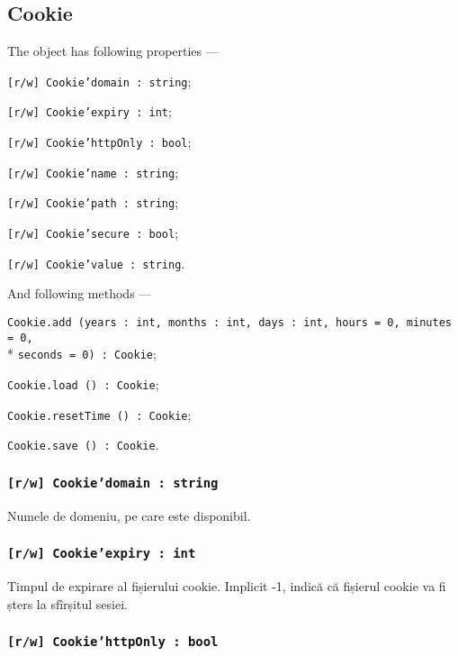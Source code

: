 \subsection{{\color{orange} Cookie}}

The object \cookie{} has following properties —
\begin{icItems}
	\item \texttt{[r/w] Cookie'domain : string};
	\item \texttt{[r/w] Cookie'expiry : int};
	\item \texttt{[r/w] Cookie'httpOnly : bool};
	\item \texttt{[r/w] Cookie'name : string};
	\item \texttt{[r/w] Cookie'path : string};
	\item \texttt{[r/w] Cookie'secure : bool};
	\item \texttt{[r/w] Cookie'value : string}.
\end{icItems}

And following methods —
\begin{icItems}
	\item \texttt{Cookie.add (years : int, months : int, days : int, hours = 0, minutes = 0,}\\* \texttt{seconds = 0) : Cookie};
	\item \texttt{Cookie.load () : Cookie};
	\item \texttt{Cookie.resetTime () : Cookie};
	\item \texttt{Cookie.save () : Cookie}.
\end{icItems}

\subsubsection{\texttt{[r/w] Cookie'domain : string}}

Numele de domeniu, pe care \cookie{} este disponibil.

\subsubsection{\texttt{[r/w] Cookie'expiry : int}}

Timpul de expirare al fișierului cookie. Implicit -1, indică că fișierul cookie va fi șters la sfîrșitul sesiei.

\subsubsection{\texttt{[r/w] Cookie'httpOnly : bool}}


